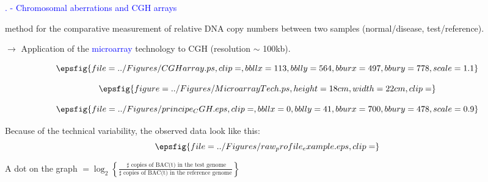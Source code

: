 \documentclass[dvips, lscape]{foils}
\newcommand{\textblue}[1]{\textcolor{blue}{#1}}
\newcommand{\section}[1]{
  \addtocounter{section}{1}
  \setcounter{subsection}{0}
  {\centerline{\Large \textblue{\arabic{chapter}.\arabic{section} - #1}}}
  }
\newcommand{\subsection}[1]{
  \addtocounter{subsection}{1}
  {\noindent{\large \textblue{#1}}}
  }
\newcommand{\paragraph}[1]{\noindent{\textblue{#1}}}
\begin{document}
\bigskip\bigskip
\section{Chromosomal aberrations and CGH arrays}

\paragraph{CGH = Comparative Genomic Hybridization:} method for the
comparative measurement of relative DNA copy numbers between two
samples (normal/disease, test/reference).\\
\centerline{$\rightarrow$ Application of the \textblue{microarray}
  technology to CGH (resolution $\sim$ 100kb).}
$$
\epsfig{file = ../Figures/CGHarray.ps, clip=,
  bbllx=113, bblly=564, bburx=497, bbury=778, scale=1.1}
$$

\newpage
\subsection{Microarray technology in its principle }
\vspace{-1cm}
$$
\epsfig{figure=../Figures/MicroarrayTech.ps, height=18cm,
  width=22cm, clip=}
$$

\newpage
\subsection{Plotting the ratio along the chromosome}
$$
\epsfig{file = ../Figures/principe_CGH.eps, clip=,
  bbllx=0, bblly=41, bburx=700, bbury=478, scale=0.9}
$$

\newpage
\paragraph{CGH profile.} Because of the technical variability, the
observed data look like this:
$$
\epsfig{file = ../Figures/raw_profile_example.eps, clip=}
$$
\centerline{
  A dot on the graph 
  $
  \displaystyle{
    = \log_2 \left\{ \frac{\text{ $\sharp$ copies of BAC(t) in the test
          genome }}{\text{$\sharp$ copies of BAC(t) in the reference
          genome}}\right\}}
  $
}
\end{document}

